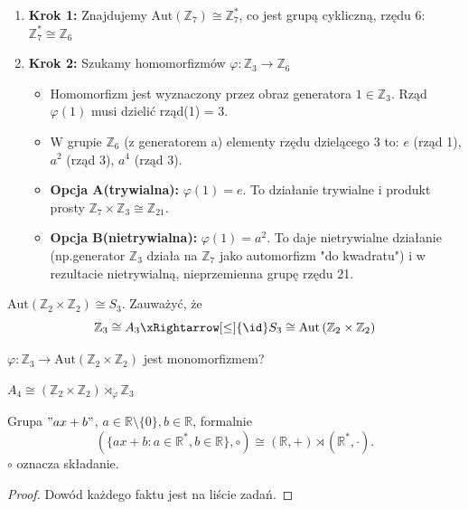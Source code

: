 \begin{remark}
\begin{enumerate}[label=\arabic*)]
\begin{itemize}
\begin{enumerate}[label=\roman*)]
					\item \textbf{Krok 1: } Znajdujemy  $\text{Aut}\left( \mathbb{Z}_7 \right) \cong \mathbb{Z}^{*}_7$, co jest grupą cykliczną, rzędu 6: $\mathbb{Z}_7^{*} \cong \mathbb{Z}_6$
					\item \textbf{Krok 2: } Szukamy homomorfizmów  $\varphi: \mathbb{Z}_3 \rightarrow \mathbb{Z}_6$
						\begin{itemize}
							\item Homomorfizm jest wyznaczony przez obraz generatora $1\in \mathbb{Z}_3$. Rząd $\varphi\left( 1 \right)$ musi dzielić rząd(1) = 3.
							\item W grupie $\mathbb{Z}_6$ (z generatorem a) elementy rzędu dzielącego 3 to: $e$ (rząd 1), $a^2 $ (rząd 3), $a^{4}$ (rząd 3).
							\item \textbf{Opcja A(trywialna): } $\varphi\left( 1 \right) = e$. To działanie trywialne i produkt prosty $\mathbb{Z}_7 \times \mathbb{Z}_3 \cong \mathbb{Z}_{21}$.
							\item \textbf{Opcja B(nietrywialna): } $\varphi\left( 1 \right) = a^2$. To daje nietrywialne działanie (np.generator $\mathbb{Z}_3$ działa na $\mathbb{Z}_7$ jako automorfizm "do kwadratu") i w rezultacie nietrywialną, nieprzemienna grupę rzędu 21. 
						\end{itemize}
				\end{enumerate}
	
		\end{itemize}
\end{enumerate}
\end{remark}

\begin{fact}

	$\text{Aut}\left( \mathbb{Z}_2\times \mathbb{Z}_2 \right) \cong S_3$.
	Zauważyć, że
	\begin{equation*}
		\mathbb{Z}_3 \cong A_3 \xRightarrow[\le ]{\id} S_3 \cong \text{Aut}\left( \mathbb{Z}_2\times \mathbb{Z}_2 \right) 
	\end{equation*}

	$\varphi: \mathbb{Z}_3 \rightarrow \text{Aut}\left( \mathbb{Z}_2\times \mathbb{Z}_2 \right) $ jest monomorfizmem?
\end{fact}
\begin{fact}

	$A_4 \cong \left( \mathbb{Z}_2\times \mathbb{Z}_2 \right) \rtimes_{\varphi} \mathbb{Z}_3$
\end{fact}
\begin{fact}

	Grupa $"ax+b"$,  $a\in \mathbb{R}\setminus \{0\} , b\in \mathbb{R}$, formalnie 
	\[
		\left( \{ax+b:a\in \mathbb{R}^{*},b\in \mathbb{R}\}, \circ  \right) \cong \left( \mathbb{R}, + \right) \rtimes \left( \mathbb{R}^{*}, \cdot  \right)  
	.\] 
	$\circ$ oznacza składanie.
\end{fact}
\begin{proof}

	Dowód każdego faktu jest na liście zadań.
\end{proof}

